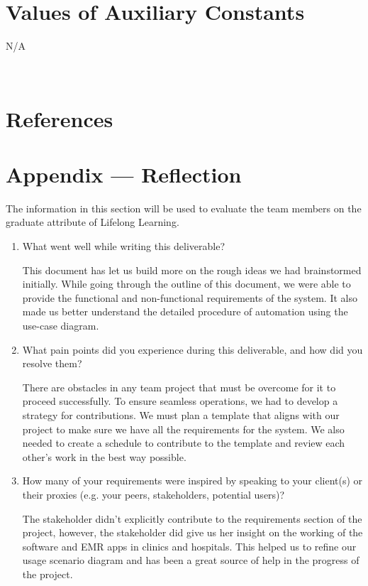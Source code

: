 \documentclass[12pt]{article}
\begin{document}
\begin{itemize}
\section{Values of Auxiliary Constants}
N/A


~\newpage

\section{References}

\newpage{}
\section*{Appendix --- Reflection}


The information in this section will be used to evaluate the team members on the
graduate attribute of Lifelong Learning.  



\begin{enumerate}
  \item What went well while writing this deliverable?
  
  This document has let us build more on the rough ideas we had brainstormed initially. While going through the outline of this document, we were able to provide the functional and non-functional requirements of the system. It also made us better understand the detailed procedure of automation using the use-case diagram. 

  \item What pain points did you experience during this deliverable, and how did
  you resolve them?

  There are obstacles in any team project that must be overcome for it to proceed successfully. To ensure seamless operations, we had to develop a strategy for contributions. We must plan a template that aligns with our project to make sure we have all the requirements for the system. We also needed to create a schedule to contribute to the template and review each other’s work in the best way possible.
  
  \item How many of your requirements were inspired by speaking to your
  client(s) or their proxies (e.g. your peers, stakeholders, potential users)?

  The stakeholder didn’t explicitly contribute to the requirements section of the project, however, the stakeholder did give us her insight on the working of the software and EMR apps in clinics and hospitals. This helped us to refine our usage scenario diagram and has been a great source of help in the progress of the project.


\end{enumerate}
\end{itemize}
\end{document}
